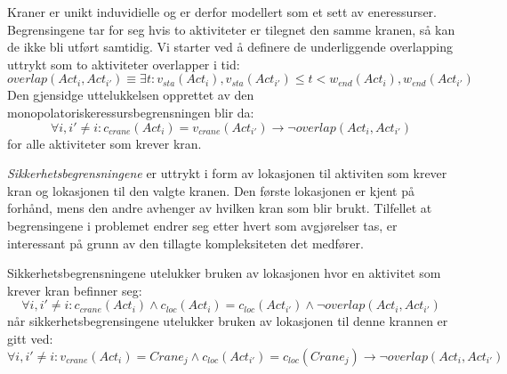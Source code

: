 Kraner er unikt induvidielle og er derfor modellert som et sett av eneressurser. Begrensingene tar for seg hvis to aktiviteter er tilegnet den samme kranen, så kan de ikke bli utført samtidig. Vi starter ved å definere de underliggende overlapping uttrykt som to aktiviteter overlapper i tid: 
\begin{equation}
overlap(Act_{i},Act_{i'}) \equiv \exists t : v_{sta}(Act_{i}),v_{sta}(Act_{i'}) \leq t < w_{end}(Act_{i}),w_{end}(Act_{i'})
\end{equation}
Den gjensidge uttelukkelsen opprettet av den monopolatoriskeressursbegrensningen blir da: 
\begin{equation}
\forall i,i' \neq i : c_{crane}(Act_{i}) = v_{crane}(Act_{i'}) \rightarrow \neg overlap(Act_{i},Act_{i'})
\end{equation}
for alle aktiviteter som krever kran.

\textit{Sikkerhetsbegrensningene} er uttrykt i form av lokasjonen til aktiviten som krever kran og lokasjonen til den valgte kranen. Den første lokasjonen er kjent på forhånd, mens den andre avhenger av hvilken kran som blir brukt. Tilfellet at begrensingene i problemet endrer seg etter hvert som avgjørelser tas, er interessant på grunn av den tillagte kompleksiteten det medfører.

Sikkerhetsbegrensningene utelukker bruken av lokasjonen hvor en aktivitet som krever kran befinner seg:
\begin{equation}
\forall i,i' \neq i : c_{crane}(Act_{i}) \wedge c_{loc}(Act_{i}) = c_{loc}(Act_{i'}) \wedge \neg overlap(Act_{i},Act_{i'})
\end{equation}
når sikkerhetsbegrensingene utelukker bruken av lokasjonen til denne krannen er gitt ved:
\begin{equation}
\forall i,i' \neq i : v_{crane}(Act_{i}) = Crane_{j} \wedge c_{loc}(Act_{i'}) = c_{loc}(Crane_{j}) \rightarrow \neg overlap(Act_{i},Act_{i'})
\end{equation}

